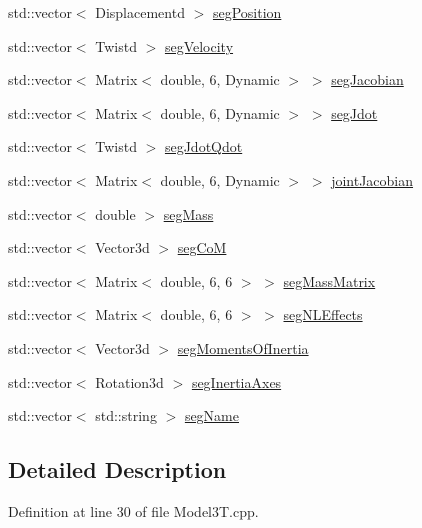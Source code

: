\begin{DoxyCompactItemize}
std\+::vector$<$ Displacementd $>$ \hyperlink{structModel3T_1_1Pimpl_a95a2564c9002bdb208279d591fca70ad}{seg\+Position}
\item 
std\+::vector$<$ Twistd $>$ \hyperlink{structModel3T_1_1Pimpl_a53fc477028c2bc87ee7c5e04879e8c20}{seg\+Velocity}
\item 
std\+::vector$<$ Matrix$<$ double, 6, Dynamic $>$ $>$ \hyperlink{structModel3T_1_1Pimpl_ab1a67acf0553a0bf04275f5f20c2a69e}{seg\+Jacobian}
\item 
std\+::vector$<$ Matrix$<$ double, 6, Dynamic $>$ $>$ \hyperlink{structModel3T_1_1Pimpl_af9cd027badf0a713437cd6d1a924cfb6}{seg\+Jdot}
\item 
std\+::vector$<$ Twistd $>$ \hyperlink{structModel3T_1_1Pimpl_a504aa134750da2f42dfe8fa7e431b9cd}{seg\+Jdot\+Qdot}
\item 
std\+::vector$<$ Matrix$<$ double, 6, Dynamic $>$ $>$ \hyperlink{structModel3T_1_1Pimpl_a8dbebd103170b8f5b8aa5ce4dd383696}{joint\+Jacobian}
\item 
std\+::vector$<$ double $>$ \hyperlink{structModel3T_1_1Pimpl_a96656676ff3aa9cddb99f58f453786c7}{seg\+Mass}
\item 
std\+::vector$<$ Vector3d $>$ \hyperlink{structModel3T_1_1Pimpl_add8bdb5e94533189b2173a43102eee84}{seg\+CoM}
\item 
std\+::vector$<$ Matrix$<$ double, 6, 6 $>$ $>$ \hyperlink{structModel3T_1_1Pimpl_a7d3d20f64bbe278275b6e74a49ebf9f6}{seg\+Mass\+Matrix}
\item 
std\+::vector$<$ Matrix$<$ double, 6, 6 $>$ $>$ \hyperlink{structModel3T_1_1Pimpl_a13b0782e9a8fb952f2fa33227277102f}{seg\+N\+L\+Effects}
\item 
std\+::vector$<$ Vector3d $>$ \hyperlink{structModel3T_1_1Pimpl_a4c64f2048ff9ce34719e3ea2a384a263}{seg\+Moments\+Of\+Inertia}
\item 
std\+::vector$<$ Rotation3d $>$ \hyperlink{structModel3T_1_1Pimpl_aeb0889ba54a539cba37b30d2826ad61b}{seg\+Inertia\+Axes}
\item 
std\+::vector$<$ std\+::string $>$ \hyperlink{structModel3T_1_1Pimpl_a2cab0a9da7f7c37d10152cac8c8e6cfc}{seg\+Name}
\end{DoxyCompactItemize}


\subsection{Detailed Description}


Definition at line 30 of file Model3\+T.\+cpp.



